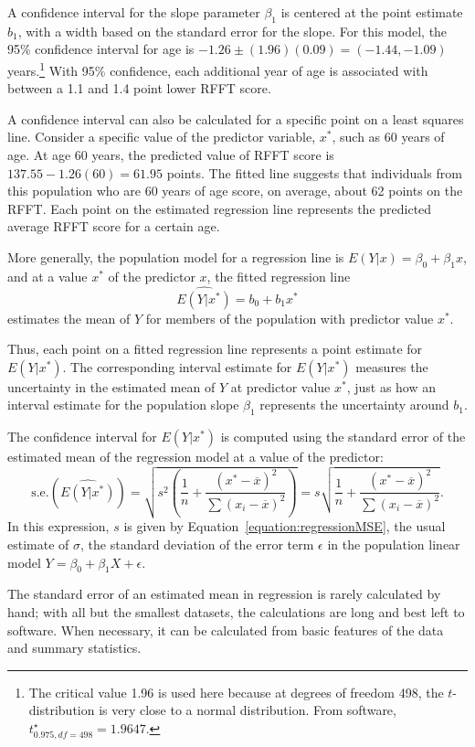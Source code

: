 A confidence interval for the slope parameter $\beta_1$ is centered at the point estimate $b_1$, with a width based on the standard error for the slope. For this model, the 95\% confidence interval for age is  $-1.26 \pm (1.96)(0.09) = (-1.44, -1.09)$ years.\footnote{The critical value 1.96 is used here because at degrees of freedom 498, the $t$-distribution is very close to a normal distribution. From software, $t^\star_{0.975, df = 498} = 1.9647$.} With 95\% confidence, each additional year of age is associated with between a 1.1 and 1.4 point lower RFFT score.

A confidence interval can also be calculated for a specific point on a least squares line. Consider a specific value of the predictor variable, $x^*$, such as 60 years of age. At age 60 years, the predicted value of RFFT score is $137.55 - 1.26(60) = 61.95$ points. The fitted line suggests that individuals from this population who are 60 years of age score, on average, about 62 points on the RFFT. Each point on the estimated regression line represents the predicted average RFFT score for a certain age.

More generally, the population model for a regression line is $E(Y|x) = \beta_0 + \beta_1 x$, and at a value $x^*$ of the predictor $x$, the fitted regression line 
\[ \widehat{E(Y|x^*)} = b_0 + b_1 x^* \]
estimates the mean of $Y$ for members of the population with predictor value $x^*$.

Thus, each point on a fitted regression line represents a point estimate for $E(Y|x^*)$. The corresponding interval estimate for $E(Y|x^*)$ measures the uncertainty in the estimated mean of $Y$ at predictor value $x^*$, just as how an interval estimate for the population slope $\beta_1$ represents the uncertainty around $b_1$. 

\textD{\newpage}

The confidence interval for $E(Y|x^*)$ is computed using the standard error of the estimated mean of the regression model at a value of the predictor:  
\[\text{s.e.}(\widehat{E(Y|x^*)}) = \sqrt{s^2 \left( \frac{1}{n} + \dfrac{(x^*-\overline{x})^2}{\sum(x_i-\overline{x})^2}\right)} = s\sqrt{\frac{1}{n} + \dfrac{(x^*-\overline{x})^2}{\sum(x_i-\overline{x})^2}}.  \]
In this expression, $s$ is given by Equation~\ref{equation:regressionMSE}, the usual estimate of $\sigma$, the standard deviation of the error term $\epsilon$ in the population linear model $Y = \beta_0 + \beta_1X + \epsilon$.

The standard error of an estimated mean in regression is rarely calculated by hand; with all but the smallest datasets, the calculations are long and best left to software.  When necessary, it can be calculated from basic features of the data and summary statistics.  

